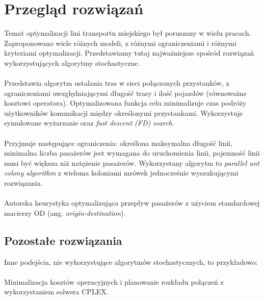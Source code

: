 \documentclass[polish,12pt]{aghthesis}
\begin{document}
\newpage




\section{Przegląd rozwiązań}
Temat optymalizacji lini transportu miejskiego był poruszany w wielu pracach. Zaproponowano wiele różnych modeli, z różnymi ograniczeniami i różnymi kryteriami optymalizacji. Przedstawiamy tutaj najważniejsze spośród rozwiązań wykorzystujących algorytmy stochastyczne.

\paragraph{\cite{bib-large-scale}}
Przedstawia algorytm ustalania tras w sieci połączonych przystanków, z ograniczeniami uwzględniającymi długość trasy i ilość pojazdów (równoważne kosztowi operatora). Optymalizowana funkcja celu minimalizuje czas podróży użytkowników komunikacji między określonymi przystankami. Wykorzystuje symulowane wyżarzanie oraz \textit{fast descent (FD) search}.

\paragraph{\cite{bib-ant-colony}}
Przyjmuje następujące ograniczenia: określona maksymalna długość linii, minimalna liczba pasażerów jest wymagana do uruchomienia linii, pojemność linii musi być większa niż natężenie pasażerów. Wykorzystany algorytm to \textit{parallel ant colony algorithm} z wieloma koloniami mrówek jednocześnie wyszukującymi rozwiązania.

\paragraph{\cite{bib-transit-oriented}}
Autorska heurystyka optymalizująca przepływ pasażerów z użyciem standardowej macierzy OD (ang. \textit{origin-destination}).

\subsection{Pozostałe rozwiązania}
Inne podejścia, nie wykorzystujące algorytmów stochastycznych, to przykładowo:

\paragraph{\cite{bib-route-optimization}}
Minimalizacja kosztów operacyjnych i planowanie rozkładu połączeń z wykorzystaniem solwera CPLEX.
\end{document}
